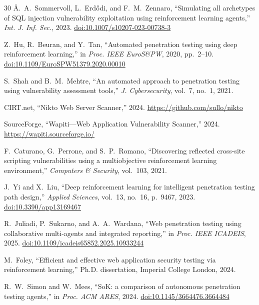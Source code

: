 \documentclass[5p,twocolumn]{elsarticle}
\begin{document}
\begin{thebibliography}{30}
 {\AA}.~A.~Sommervoll, L.~Erd{\H o}di, and F.~M.~Zennaro, ``Simulating all archetypes of SQL injection vulnerability exploitation using reinforcement learning agents,'' \emph{Int. J. Inf. Sec.}, 2023. \href{https://doi.org/10.1007/s10207-023-00738-3}{doi:10.1007/s10207-023-00738-3}

 Z.~Hu, R.~Beuran, and Y.~Tan, ``Automated penetration testing using deep reinforcement learning,'' in \emph{Proc. IEEE EuroS\&PW}, 2020, pp.~2--10. \href{https://doi.org/10.1109/EuroSPW51379.2020.00010}{doi:10.1109/EuroSPW51379.2020.00010}

 S.~Shah and B.~M.~Mehtre, ``An automated approach to penetration testing using vulnerability assessment tools,'' \emph{J. Cybersecurity}, vol.~7, no.~1, 2021.

 CIRT.net, ``Nikto Web Server Scanner,'' 2024. \url{https://github.com/sullo/nikto}

 SourceForge, ``Wapiti---Web Application Vulnerability Scanner,'' 2024. \url{https://wapiti.sourceforge.io/}

 F.~Caturano, G.~Perrone, and S.~P.~Romano, ``Discovering reflected cross-site scripting vulnerabilities using a multiobjective reinforcement learning environment,'' \emph{Computers \& Security}, vol.~103, 2021.

 J.~Yi and X.~Liu, ``Deep reinforcement learning for intelligent penetration testing path design,'' \emph{Applied Sciences}, vol.~13, no.~16, p.~9467, 2023. \href{https://doi.org/10.3390/app13169467}{doi:10.3390/app13169467}

 R.~Juliadi, P.~Sukarno, and A.~A.~Wardana, ``Web penetration testing using collaborative multi-agents and integrated reporting,'' in \emph{Proc. IEEE ICADEIS}, 2025. \href{https://doi.org/10.1109/icadeis65852.2025.10933244}{doi:10.1109/icadeis65852.2025.10933244}

 M.~Foley, ``Efficient and effective web application security testing via reinforcement learning,'' Ph.D. dissertation, Imperial College London, 2024.

 R.~W.~Simon and W.~Mees, ``SoK: a comparison of autonomous penetration testing agents,'' in \emph{Proc. ACM ARES}, 2024. \href{https://doi.org/10.1145/3664476.3664484}{doi:10.1145/3664476.3664484}

\end{thebibliography}
\end{document}
